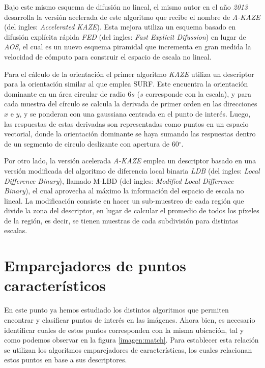 Bajo este mismo esquema de difusión no lineal, el mismo autor en el año \textit{2013} desarrolla la versión acelerada de este algoritmo que recibe el nombre de \textit{A-KAZE} \cite{akaze} (del ingles: \textit{Accelerated KAZE}). Esta mejora utiliza un esquema basado en difusión explícita rápida \textit{FED} (del ingles: \textit{Fast Explicit Difussion}) en lugar de \textit{AOS}, el cual es un nuevo esquema piramidal que incrementa en gran medida la velocidad de cómputo para construir el espacio de escala no lineal.

Para el cálculo de la orientación el primer algoritmo \textit{KAZE} utiliza un descriptor para la orientación similar al que emplea SURF. Este encuentra la orientación dominante en un área circular de radio 6$s$ ($s$ corresponde con la escala), y para cada muestra del círculo se calcula la derivada de primer orden en las direcciones $x$ e $y$, y se ponderan con una gaussiana centrada en el punto de interés. Luego, las respuestas de estas derivadas son representadas como puntos en un espacio vectorial, donde la orientación dominante se haya sumando las respuestas dentro de un segmento de circulo deslizante con apertura de 60$^\circ$.

Por otro lado, la versión acelerada \textit{A-KAZE} emplea un descriptor basado en una versión modificada del algoritmo de diferencia local binaria \textit{LDB} \cite{ldb} (del ingles: \textit{Local Difference Binary}), llamado M-LBD (del ingles: \textit{Modified Local Difference Binary}), el cual aprovecha al máximo la información del espacio de escala no lineal. La modificación consiste en hacer un sub-muestreo de cada región que divide la zona del descriptor, en lugar de calcular el promedio de todos los píxeles de la región, es decir, se tienen muestras de cada subdivisión para distintas escalas.


\section{Emparejadores de puntos característicos}

En este punto ya hemos estudiado los distintos algoritmos que permiten encontrar y clasificar puntos de interés en las imágenes. Ahora bien, es necesario identificar cuales de estos puntos corresponden con la misma ubicación, tal y como podemos observar en la figura \ref*{imagen:match}. Para establecer esta relación se utilizan los algoritmos emparejadores de características, los cuales relacionan estos puntos en base a sus descriptores.


